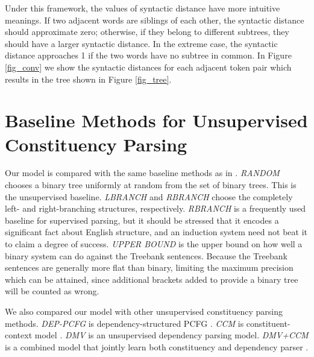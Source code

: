 \documentclass{article} \usepackage{iclr2018_conference,times}
\begin{document}
Under this framework, the values of syntactic distance have more intuitive meanings. If two adjacent words are siblings of each other, the syntactic distance should approximate zero; otherwise, if they belong to different subtrees, they should have a larger syntactic distance. In the extreme case, the syntactic distance approaches 1 if the two words have no subtree in common. In Figure \ref{fig_conv} we show the syntactic distances for each adjacent token pair which results in the tree shown in Figure \ref{fig_tree}. 


\section{Baseline Methods for Unsupervised Constituency Parsing} \label{appendix_parser_baseline}
Our model is compared with the same baseline methods as in \citep{klein2005natural}. \emph{RANDOM} chooses a binary tree uniformly at random from the set of binary trees. This is the unsupervised baseline. \emph{LBRANCH} and \emph{RBRANCH} choose the completely left- and right-branching structures, respectively. \emph{RBRANCH} is a frequently used baseline for supervised parsing, but it should be stressed that it encodes a significant fact about English structure, and an induction system need not beat it to claim a degree of success. \emph{UPPER BOUND} is the upper bound on how well a binary system can do against the Treebank sentences. Because the Treebank sentences are generally more flat than binary, limiting the maximum precision which can be attained, since additional brackets added to provide a binary tree will be counted as wrong.

We also compared our model with other unsupervised constituency parsing methods. \emph{DEP-PCFG} is dependency-structured PCFG \citep{carroll1992two}. \emph{CCM} is constituent-context model \citep{klein2002generative}. \emph{DMV} is an unsupervised dependency parsing model. \emph{DMV+CCM} is a combined model that jointly learn both constituency and dependency parser \citep{klein2004corpus}.



\appendix
\clearpage{}
\end{document}
